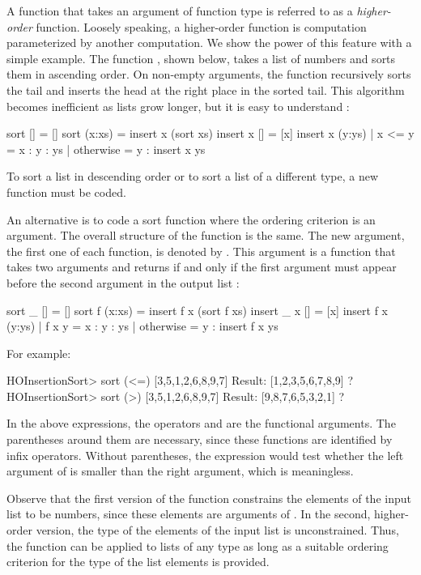 A function that takes an argument of function type is referred
to as a \emph{higher-order} function.
Loosely speaking, a higher-order function is computation parameterized
by another computation.
We show the power of this feature with a simple example.
The function , shown below,
takes a list of numbers and sorts them in ascending order.
On non-empty arguments, the function  recursively sorts the tail
and inserts the head at the right place in the sorted tail.
This algorithm becomes inefficient as lists grow longer,
but it is easy to understand
:
%
\begin{prog}
\label{InsertSort}
sort []     = []
sort (x:xs) = insert x (sort xs)
\medskip
insert x [] = [x]
insert x (y:ys) | x <= y    = x : y : ys
                | otherwise = y : insert x ys
\end{prog}
%
To sort a list in descending order or to sort a list
of a different type, a new function must be coded.

An alternative is to code a sort function where the ordering
criterion is an argument.
The overall structure of the function is the same.
The new argument, the first one of each function,
is denoted by .
This argument is a function that takes two arguments
and returns  if and only if the first argument
must appear before the second argument in the output list
:
%
\begin{prog}
\label{HOInsertionSort}
sort _ []     = []
sort f (x:xs) = insert f x (sort f xs)
\medskip
insert _ x [] = [x]
insert f x (y:ys) | f x y     = x : y : ys
                  | otherwise = y : insert f x ys
\end{prog}
%
For example:
%
\begin{prog}
HOInsertionSort> sort (<=) [3,5,1,2,6,8,9,7]
Result: [1,2,3,5,6,7,8,9] ? 
HOInsertionSort> sort (>) [3,5,1,2,6,8,9,7]
Result: [9,8,7,6,5,3,2,1] ? 
\end{prog}
%
In the above expressions, 
the operators \ccode{<=} and \ccode{>} are the functional arguments.
The parentheses around them are necessary, since these
functions are identified by infix operators.
Without parentheses, the expression 
would test whether the left argument of \ccode{<=}
is smaller than the right argument, which is meaningless.

Observe that the first version of the  function constrains
the elements of the input list to be numbers,
since these elements are arguments of \ccode{<=}.
In the second, higher-order version, the type 
of the elements of the input list is unconstrained.
Thus, the function can be applied to lists of any type
as long as a suitable ordering criterion
for the type of the list elements is provided.

